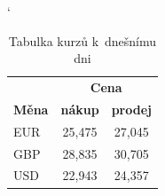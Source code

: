 \documentclass[a4paper, 11pt]{article}
\begin{document}
        \begin{table}[ht] \label{tabulka}
            \centering
            \catcode` %
            \begin{tabular}{|l|c|c|}
                \hline
                & \multicolumn{2}{c|}{\textbf{Cena}} \\
                \cline{2-3}
                \textbf{Měna} & \textbf{nákup} & \textbf{prodej} \\
                \hline
                EUR & 25{,}475 & 27{,}045 \\
                GBP & 28{,}835 & 30{,}705 \\
                USD & 22{,}943 & 24{,}357 \\
                \hline
            \end{tabular}
            \caption{Tabulka kurzů k~dnešnímu dni}
        \end{table}

        \bigskip
\end{document}
